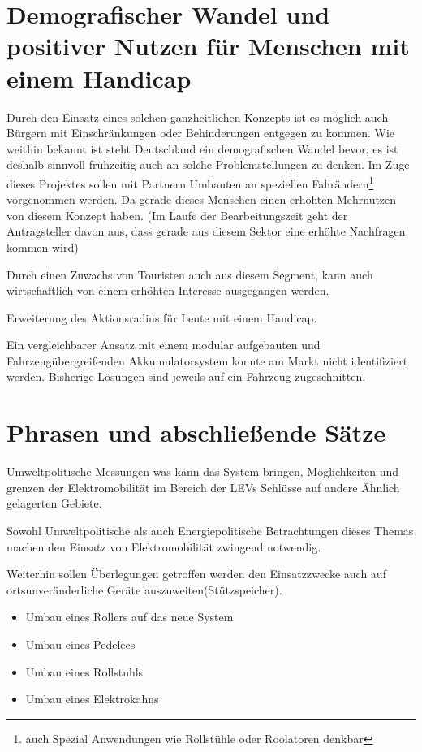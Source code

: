 \section{Demografischer Wandel und positiver Nutzen für Menschen mit einem Handicap}

Durch den Einsatz eines solchen ganzheitlichen Konzepts ist es möglich auch Bürgern mit Einschränkungen oder Behinderungen entgegen zu kommen.
Wie weithin bekannt ist steht Deutschland ein demografischen Wandel bevor, es ist deshalb sinnvoll frühzeitig auch an solche Problemstellungen zu denken.
Im Zuge dieses Projektes sollen mit Partnern Umbauten an speziellen Fahrändern\footnote{auch Spezial Anwendungen wie Rollstühle oder Roolatoren denkbar} vorgenommen werden. Da gerade dieses Menschen einen erhöhten Mehrnutzen von diesem Konzept haben. (Im Laufe der Bearbeitungszeit geht der Antragsteller davon aus, dass gerade aus diesem Sektor eine erhöhte Nachfragen kommen wird)

Durch einen Zuwachs von Touristen auch aus diesem Segment, kann auch wirtschaftlich von einem erhöhten Interesse ausgegangen werden.

Erweiterung des Aktionsradius für Leute mit einem Handicap.




Ein vergleichbarer Ansatz mit einem modular aufgebauten und Fahrzeugübergreifenden Akkumulatorsystem konnte am Markt nicht identifiziert werden. Bisherige Lösungen sind jeweils auf ein Fahrzeug zugeschnitten. 


\section{Phrasen und abschließende Sätze}
Umweltpolitische Messungen was kann das System bringen, Möglichkeiten und grenzen der Elektromobilität im Bereich der LEVs
Schlüsse auf andere Ähnlich gelagerten Gebiete.

Sowohl Umweltpolitische als auch Energiepolitische Betrachtungen dieses Themas machen den Einsatz von Elektromobilität zwingend notwendig. 


Weiterhin sollen Überlegungen getroffen werden den Einsatzzwecke auch auf ortsunveränderliche Geräte auszuweiten(Stützspeicher).

\begin{itemize}
	\item Umbau eines Rollers auf das neue System
	\item Umbau eines Pedelecs
	\item Umbau eines Rollstuhls
	\item Umbau eines Elektrokahns
\end{itemize}